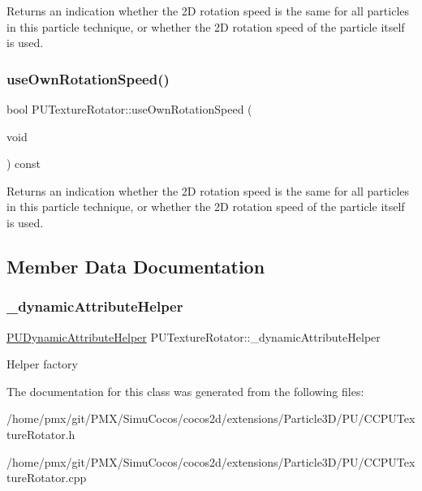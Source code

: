 Returns an indication whether the 2D rotation speed is the same for all particles in this particle technique, or whether the 2D rotation speed of the particle itself is used. \mbox{\label{classPUTextureRotator_a6438d215b7fb851bc898a4abc46b32f2}} 
\subsubsection{\texorpdfstring{use\+Own\+Rotation\+Speed()}{useOwnRotationSpeed()}\hspace{0.1cm}{\footnotesize\ttfamily [2/2]}}
{\footnotesize\ttfamily bool P\+U\+Texture\+Rotator\+::use\+Own\+Rotation\+Speed (\begin{DoxyParamCaption}\item[{void}]{ }\end{DoxyParamCaption}) const}

Returns an indication whether the 2D rotation speed is the same for all particles in this particle technique, or whether the 2D rotation speed of the particle itself is used. 

\subsection{Member Data Documentation}
\mbox{\label{classPUTextureRotator_aa24282dbcd3b88a10d78bafa5824840f}} 
\subsubsection{\texorpdfstring{\+\_\+dynamic\+Attribute\+Helper}{\_dynamicAttributeHelper}}
{\footnotesize\ttfamily \hyperlink{classPUDynamicAttributeHelper}{P\+U\+Dynamic\+Attribute\+Helper} P\+U\+Texture\+Rotator\+::\+\_\+dynamic\+Attribute\+Helper\hspace{0.3cm}{\ttfamily [protected]}}

Helper factory 

The documentation for this class was generated from the following files\+:\begin{DoxyCompactItemize}
\item 
/home/pmx/git/\+P\+M\+X/\+Simu\+Cocos/cocos2d/extensions/\+Particle3\+D/\+P\+U/C\+C\+P\+U\+Texture\+Rotator.\+h\item 
/home/pmx/git/\+P\+M\+X/\+Simu\+Cocos/cocos2d/extensions/\+Particle3\+D/\+P\+U/C\+C\+P\+U\+Texture\+Rotator.\+cpp\end{DoxyCompactItemize}
